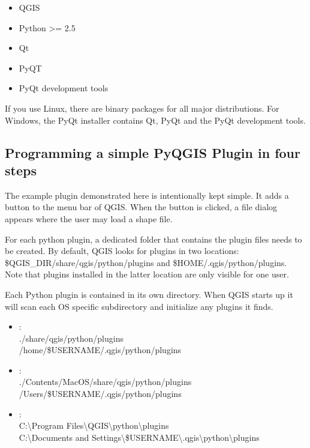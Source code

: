 \begin{itemize}
\item QGIS
\item Python >= 2.5
\item Qt
\item PyQT
\item PyQt development tools
\end{itemize}

If you use Linux, there are binary packages for all major distributions. For
Windows, the PyQt installer contains Qt, PyQt and the PyQt development tools.

\subsection{Programming a simple PyQGIS Plugin in four steps}\label{subsec:pyfoursteps}

The example plugin demonstrated here is intentionally kept simple. It adds a button to the menu
bar of QGIS. When the button is clicked, a file dialog appears where the user
may load a shape file.

For each python plugin, a dedicated folder that contains the plugin files
needs to be created. By default, QGIS looks for plugins in
two locations: \$QGIS\_DIR/share/qgis/python/plugins and \$HOME/.qgis/python/plugins.
Note that plugins installed in the latter location are only visible for one user.


Each Python plugin is contained in its own directory. When QGIS starts up it
will scan each OS specific subdirectory and initialize any plugins it finds. 

\begin{itemize}
\item {}:\\
./share/qgis/python/plugins \\
/home/\$USERNAME/.qgis/python/plugins
\item {}:\\
./Contents/MacOS/share/qgis/python/plugins \\
/Users/\$USERNAME/.qgis/python/plugins
\item {}:\\
C:\textbackslash Program Files\textbackslash QGIS\textbackslash python\textbackslash plugins \\
C:\textbackslash Documents and Settings\textbackslash\$USERNAME\textbackslash .qgis\textbackslash python\textbackslash plugins

\end{itemize}

